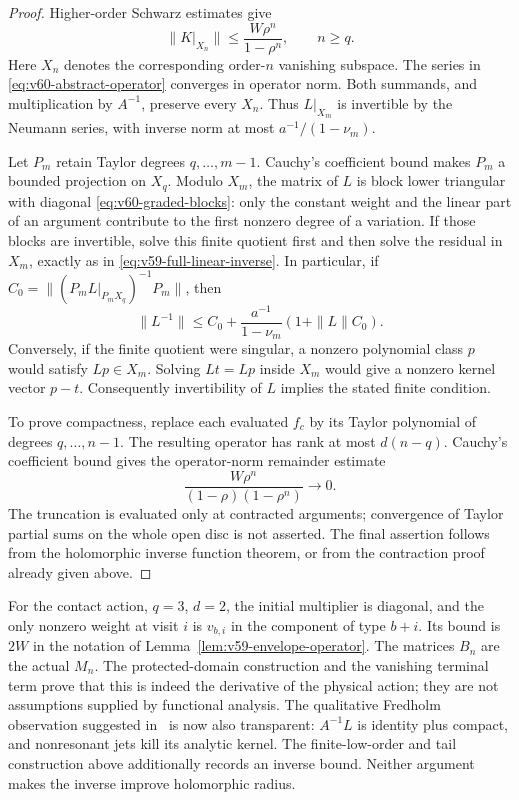 \begin{proof}
Higher-order Schwarz estimates give
\[
 \|K|_{X_n}\|\le \frac{W\rho^n}{1-\rho^n},\qquad n\ge q.
\]
Here $X_n$ denotes the corresponding order-$n$ vanishing subspace.
The series in \eqref{eq:v60-abstract-operator} converges in operator
norm.  Both summands, and multiplication by $A^{-1}$, preserve every
$X_n$.  Thus $L|_{X_m}$ is invertible by the Neumann series, with
inverse norm at most $a^{-1}/(1-\nu_m)$.

Let $P_m$ retain Taylor degrees $q,\ldots,m-1$.  Cauchy's coefficient
bound makes $P_m$ a bounded projection on $X_q$.
Modulo $X_m$, the matrix of $L$ is block lower triangular with diagonal
\eqref{eq:v60-graded-blocks}: only the constant weight and the linear
part of an argument contribute to the first nonzero degree of a
variation.  If those blocks are invertible, solve this finite quotient
first and then solve the residual in $X_m$, exactly as in
\eqref{eq:v59-full-linear-inverse}.  In particular, if
$C_0=\|(P_mL|_{P_mX_q})^{-1}P_m\|$, then
\[
 \|L^{-1}\|\le C_0+\frac{a^{-1}}{1-\nu_m}(1+\|L\|C_0).
\]
Conversely, if the finite quotient were singular, a nonzero polynomial
class $p$ would satisfy $Lp\in X_m$.  Solving
$Lt=Lp$ inside $X_m$ would give a nonzero kernel vector $p-t$.
Consequently invertibility of $L$ implies the stated finite condition.

To prove compactness, replace each evaluated $f_c$ by its Taylor
polynomial of degrees $q,\ldots,n-1$.  The resulting operator has rank
at most $d(n-q)$.  Cauchy's coefficient bound gives the operator-norm
remainder estimate
\[
       \frac{W\rho^n}{(1-\rho)(1-\rho^n)}\longrightarrow0.
\]
The truncation is evaluated only at contracted arguments; convergence
of Taylor partial sums on the whole open disc is not asserted.
The final assertion follows from the holomorphic inverse function
theorem, or from the contraction proof already given above.
\end{proof}

For the contact action, $q=3$, $d=2$, the initial multiplier is diagonal,
and the only nonzero weight at visit $i$ is $v_{b,i}$ in the component
of type $b+i$.  Its bound is $2W$ in the notation of
Lemma~\ref{lem:v59-envelope-operator}.  The matrices $B_n$ are the
actual $M_n$.  The protected-domain construction and the vanishing
terminal term prove that this is indeed the derivative of the physical
action; they are not assumptions supplied by functional analysis.
The qualitative Fredholm observation suggested in~\cite{A2ReviewV59}
is now also transparent: $A^{-1}L$ is identity plus compact, and
nonresonant jets kill its analytic kernel.  The finite-low-order and
tail construction above additionally records an inverse bound.
Neither argument makes the inverse improve holomorphic radius.

